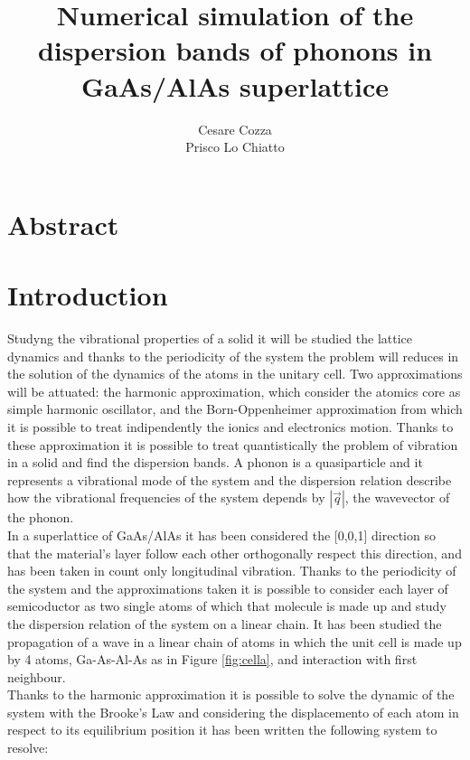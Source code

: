 \documentclass{article}
\begin{document}
 
	
	\author{Cesare Cozza \\ Prisco Lo Chiatto }
	\title{Numerical simulation of the dispersion bands of phonons in GaAs/AlAs superlattice}
	
	\maketitle
    \newpage
    
    
\section{Abstract}




\section{Introduction}
Studyng the vibrational properties of a solid it will be studied the lattice dynamics and thanks to the periodicity of the system the problem will reduces in the solution of the dynamics of the atoms in the unitary cell. Two approximations will be attuated: the harmonic approximation, which consider the atomics core as simple harmonic oscillator, and the Born-Oppenheimer approximation from which it is possible to treat indipendently the ionics and electronics motion. Thanks to these approximation it is possible to treat quantistically the problem of vibration in a solid and find the dispersion bands. A phonon is a quasiparticle and it represents a vibrational mode of the system and the dispersion relation describe how the vibrational frequencies of the system depends by $|\vec{q}|$, the wavevector of the phonon. \\
In a superlattice of GaAs/AlAs it has been considered the [0,0,1] direction so that the material's layer follow each other orthogonally respect this direction, and has been taken in count only longitudinal vibration. Thanks to the periodicity of the system and the approximations taken it is possible to consider each layer of semicoductor as two single atoms of which that molecule is made up and study the dispersion relation of the system on a linear chain. It has been studied the propagation of a wave in a linear chain of atoms in which the unit cell is made up by 4 atoms, Ga-As-Al-As as in Figure \ref{fig:cella}, and interaction with first neighbour. \\
Thanks to the harmonic approximation it is possible to solve the dynamic of the system with the Brooke's Law and considering the displacemento of each atom in respect to its equilibrium position it has been written the following system to resolve:
\end{document}
